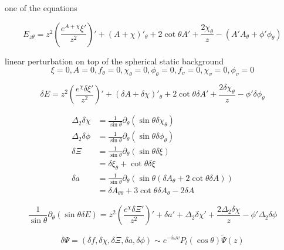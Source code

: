 \documentclass[12pt,a4paper]{ctexart}
\numberwithin{equation}{section}
\begin{document}
one of the equations

\begin{equation}
    E_{z\theta}=z^2\left(\frac{e^{A+\chi} \xi'}{z^{2}}\right)' + (A+\chi)'_\theta + 2 \cot\theta A' + \frac{2 \chi_\theta}{z} - (A' A_\theta + \phi' \phi_\theta)
\end{equation}

linear perturbation on top of the spherical static background
\begin{equation}
    \xi=0,A=0,f_\theta=0,\chi_\theta=0,\phi_\theta=0,f_v=0,\chi_v=0,\phi_v=0
\end{equation}

\begin{equation}
    \delta E=z^2\left(\frac{e^{\chi} \delta\xi'}{z^{2}}\right)' + (\delta A+\delta\chi)'_\theta + 2 \cot\theta \delta A' + \frac{2 \delta\chi_\theta}{z} - \phi' \delta\phi_\theta
\end{equation}

\begin{equation}
    \begin{aligned}
        \Delta_2\delta\chi &= \frac{1}{\sin\theta}\partial_\theta(\sin\theta \delta\chi_\theta)\\
        \Delta_2\delta\phi &= \frac{1}{\sin\theta}\partial_\theta(\sin\theta \delta\phi_\theta)\\
        \delta\Xi &= \frac{1}{\sin\theta}\partial_\theta(\sin\theta \delta\xi)\\
        &= \delta\xi_\theta + \cot\theta\delta\xi\\
        \delta{a} &= \frac{1}{\sin\theta}\partial_\theta(\sin\theta (\delta A_\theta+2\cot\theta \delta A))\\
        &= \delta{A}_{\theta\theta} + 3 \cot\theta \delta{A}_\theta - 2 \delta{A}
    \end{aligned}
\end{equation}

\begin{equation}
    \frac{1}{\sin\theta}\partial_\theta(\sin\theta \delta E)=z^2\left(\frac{e^{\chi} \delta\Xi'}{z^{2}}\right)' + \delta a'+\Delta_2\delta\chi' + \frac{2 \Delta_2\delta\chi}{z} - \phi' \Delta_2\delta\phi
\end{equation}

\begin{equation}
    \delta\Psi=(\delta f,\delta\chi,\delta\Xi,\delta a,\delta\phi)\sim e^{-i\omega v}P_l(\cos\theta)\tilde{\Psi}(z)
\end{equation}
\end{document}
